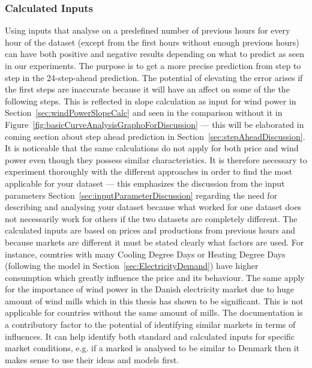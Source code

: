 \subsubsection{Calculated Inputs}
Using inputs that analyse on a predefined number of previous hours for every hour of the dataset (except from the first hours without enough previous hours) can have both positive and negative results depending on what to predict as seen in our experiments. The purpose is to get a more precise prediction from step to step in the 24-step-ahead prediction. The potential of elevating the error arises if the first steps are inaccurate because it will have an affect on some of the the following steps. This is reflected in slope calculation as input for wind power in Section~\ref{sec:windPowerSlopeCalc} and seen in the comparison without it in Figure~\ref{fig:basicCurveAnalysisGraphoForDiscussion} --- this will be elaborated in coming section about step ahead prediction in Section~\ref{sec:stepAheadDiscussion}. It is noticeable that the same calculations do not apply for both price and wind power even though they possess similar characteristics. It is therefore necessary to experiment thoroughly with the different approaches in order to find the most applicable for your dataset --- this emphasizes the discussion from the input parameters Section~\ref{sec:inputParameterDiscussion} regarding the need for describing and analysing your dataset because what worked for one dataset does not necessarily work for others if the two datasets are completely different. The calculated inputs are based on prices and productions from previous hours and because markets are different it must be stated clearly what factors are used. For instance, countries with many Cooling Degree Days or Heating Degree Days (following the model in Section~\ref{sec:ElectricityDemand}) have higher consumption which greatly influence the price and its behaviour. The same apply for the importance of wind power in the Danish electricity market due to huge amount of wind mills which in this thesis has shown to be significant. This is not applicable for countries without the same amount of mills. The documentation is a contributory factor to the potential of identifying similar markets in terms of influences. It can help identify both standard and calculated inputs for specific market conditions, e.g. if a marked is analysed to be similar to Denmark then it makes sense to use their ideas and models first.

